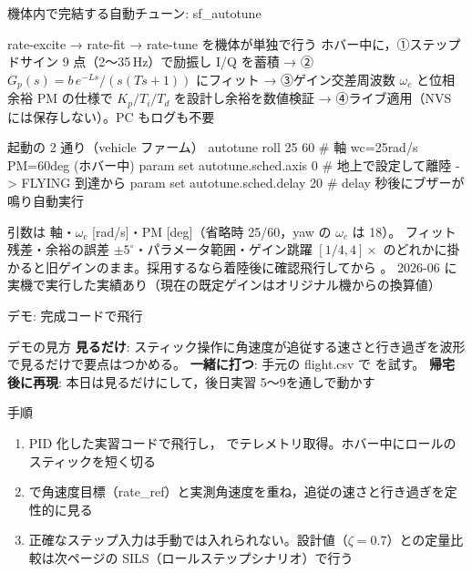 \begin{frame}[fragile]{機体内で完結する自動チューン: sf\_autotune\later}
  \begin{block}{rate-excite → rate-fit → rate-tune を機体が単独で行う}\footnotesize
    ホバー中に，①ステップドサイン 9 点（2〜35\,Hz）で励振し I/Q を蓄積 →
    ②$G_p(s)=b\,e^{-Ls}/(s(Ts+1))$ にフィット → ③ゲイン交差周波数 $\omega_c$ と位相余裕 PM の仕様で $K_p/T_i/T_d$ を設計し余裕を数値検証 →
    ④ライブ適用（NVS には保存しない）。PC もログも不要
  \end{block}

  \begin{sflisting}[basicstyle=\ttfamily\scriptsize]{起動の 2 通り（vehicle ファーム）}
autotune roll 25 60                  # 軸 wc=25rad/s PM=60deg (ホバー中)
param set autotune.sched.axis 0      # 地上で設定して離陸 -> FLYING 到達から
param set autotune.sched.delay 20    #   delay 秒後にブザーが鳴り自動実行
  \end{sflisting}

  \vspace{-0.3em}
  {\scriptsize 引数は 軸・$\omega_c$ [rad/s]・PM [deg]（省略時 25/60，yaw の $\omega_c$ は 18）。
   フィット残差・余裕の誤差 $\pm5^\circ$・パラメータ範囲・ゲイン跳躍 $[1/4, 4]\times$
  のどれかに掛かると旧ゲインのまま。採用するなら着陸後に確認飛行してから 。
  2026-06 に実機で実行した実績あり（現在の既定ゲインはオリジナル機からの換算値）}
\end{frame}


\begin{frame}{デモ: 完成コードで飛行}
  \begin{exampleblock}{デモの見方}\footnotesize
    \textbf{見るだけ}: スティック操作に角速度が追従する速さと行き過ぎを波形で見るだけで要点はつかめる。
    \textbf{一緒に打つ}: 手元の flight.csv で  を試す。
    \textbf{帰宅後に再現}: 本日は見るだけにして，後日実習 5〜9を通しで動かす
  \end{exampleblock}

  \begin{block}{手順}\footnotesize
    \begin{enumerate}
      \item PID 化した実習コードで飛行し， でテレメトリ取得。ホバー中にロールのスティックを短く切る
      \item {} で角速度目標（rate\_ref）と実測角速度を重ね，追従の速さと行き過ぎを定性的に見る
      \item 正確なステップ入力は手動では入れられない。設計値（$\zeta=0.7$）との定量比較は次ページの SILS（ロールステップシナリオ）で行う
    \end{enumerate}
  \end{block}
\end{frame}

